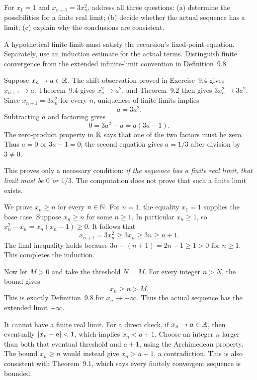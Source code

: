 
\goal For $x_1=1$ and $x_{n+1}=3x_n^2$, address all three questions:
\textup{(a)} determine the possibilities for a finite real limit;
\textup{(b)} decide whether the actual sequence has a limit;
\textup{(c)} explain why the conclusions are consistent.

\idea A hypothetical finite limit must satisfy the recursion's
fixed-point equation. Separately, use an induction estimate for the
actual terms. Distinguish finite convergence from the extended
infinite-limit convention in Definition~9.8.

Suppose $x_n\to a\in\mathbb{R}$. The shift observation proved in
Exercise~9.4 gives $x_{n+1}\to a$.
Theorem~9.4 gives $x_n^2\to a^2$, and Theorem~9.2 then gives
$3x_n^2\to3a^2$. Since $x_{n+1}=3x_n^2$ for every $n$,
uniqueness of finite limits implies
\[
 a=3a^2.
\]
Subtracting $a$ and factoring gives
\[
 0=3a^2-a=a(3a-1).
\]
The zero-product property in $\mathbb{R}$ says that one of the two factors
must be zero. Thus $a=0$ or $3a-1=0$; the second equation gives
$a=1/3$ after division by $3\ne0$.

This proves only a necessary condition: \emph{if the sequence has a
finite real limit, that limit must be $0$ or $1/3$}. The computation
does not prove that such a finite limit exists.

We prove $x_n\ge n$ for every $n\in\mathbb{N}$.
For $n=1$, the equality $x_1=1$ supplies the base case.
Suppose $x_n\ge n$ for some $n\ge1$.
In particular $x_n\ge1$, so
$x_n^2-x_n=x_n(x_n-1)\ge0$. It follows that
\[
 x_{n+1}=3x_n^2\ge3x_n\ge3n\ge n+1.
\]
The final inequality holds because
$3n-(n+1)=2n-1\ge1>0$ for $n\ge1$.
This completes the induction.

Now let $M>0$ and take the threshold $N=M$.
For every integer $n>N$, the bound gives
\[
 x_n\ge n>M.
\]
This is exactly Definition~9.8 for $x_n\to+\infty$.
Thus the actual sequence has the extended limit $+\infty$.

It cannot have a finite real limit. For a direct check, if
$x_n\to a\in\mathbb{R}$, then eventually $\left|x_n-a\right|<1$,
which implies $x_n<a+1$. Choose an integer $n$ larger than
both that eventual threshold and $a+1$, using the Archimedean
property. The bound $x_n\ge n$ would instead give $x_n>a+1$,
a contradiction. This is also consistent with Theorem~9.1,
which says every finitely convergent sequence is bounded.

